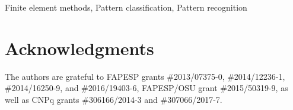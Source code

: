 \documentclass[journal]{IEEEtran}
\begin{document}
\begin{IEEEkeywords}
Finite element methods, Pattern classification, Pattern recognition
\end{IEEEkeywords}

\IEEEpeerreviewmaketitle







\section*{Acknowledgments}
The authors are grateful to FAPESP grants \#2013/07375-0, \#2014/12236-1, \#2014/16250-9, and \#2016/19403-6, FAPESP/OSU grant \#2015/50319-9, as well as CNPq grants \#306166/2014-3 and \#307066/2017-7.


\ifCLASSOPTIONcaptionsoff
  \newpage
\fi













\end{document}
